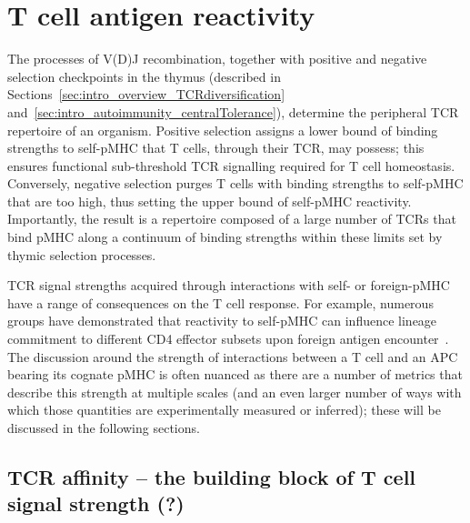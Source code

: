 \section{T cell antigen reactivity}
\label{sec:intro_affinity}

The processes of V(D)J recombination, together with positive and negative selection checkpoints in the thymus (described in Sections~\ref{sec:intro_overview_TCRdiversification} and~\ref{sec:intro_autoimmunity_centralTolerance}), determine the peripheral TCR repertoire of an organism. Positive selection assigns a lower bound of binding strengths to self-pMHC that T cells, through their TCR, may possess; this ensures functional sub-threshold TCR signalling required for T cell homeostasis. Conversely, negative selection purges T cells with binding strengths to self-pMHC that are too high, thus setting the upper bound of self-pMHC reactivity. Importantly, the result is a repertoire composed of a large number of TCRs that bind pMHC along a continuum of binding strengths within these limits set by thymic selection processes.

TCR signal strengths acquired through interactions with self- or foreign-pMHC have a range of consequences on the T cell response. For example, numerous groups have demonstrated that reactivity to self-pMHC can influence lineage commitment to different CD4\pos{} effector subsets upon foreign antigen encounter~\cite{martin2013highly,van2014t,sood2019differential,rogers2021pre,snook2018tcr,ditoro2018differential,van2016tcr}. The discussion around the strength of interactions between a T cell and an APC bearing its cognate pMHC is often nuanced as there are a number of metrics that describe this strength at multiple scales (and an even larger number of ways with which those quantities are experimentally measured or inferred); these will be discussed in the following sections.

\subsection{TCR affinity -- the building block of T cell signal strength (?)}
\label{sec:intro_TCRaffinity}

